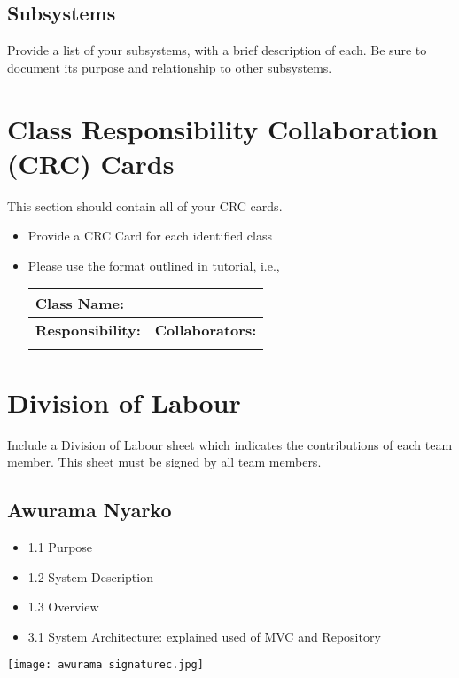 \documentclass[]{article}
\begin{document}
\subsection{Subsystems}
\label{sub:subsystems}
 Provide a list of your subsystems, with a brief description of each. Be sure to document its purpose and relationship to other subsystems.


	
\section{Class Responsibility Collaboration (CRC) Cards}
\label{sec:class_responsibility_collaboration_crc_cards}
This section should contain all of your CRC cards.

\begin{itemize}
	\item Provide a CRC Card for each identified class
	\item Please use the format outlined in tutorial, i.e., 
	\begin{table}[ht]
		\centering
		\begin{tabular}{|p{5cm}|p{5cm}|}
		\hline 
		 \multicolumn{2}{|l|}{\textbf{Class Name:}} \\
		\hline
		\textbf{Responsibility:} & \textbf{Collaborators:} \\
		\hline
		\vspace{1in} & \\
		\hline
		\end{tabular}
	\end{table}
	
\end{itemize}

\appendix
\section{Division of Labour}
\label{sec:division_of_labour}
Include a Division of Labour sheet which indicates the contributions of each team member. This sheet must be signed by all team members.
\subsection{Awurama Nyarko}
\label{subsec:awurama_nyarko}
\begin{itemize}
	\item 1.1 Purpose
	\item 1.2 System Description
	\item 1.3 Overview
	\item 3.1 System Architecture: explained used of MVC and Repository
\end{itemize}
\texttt{[image: awurama signaturec.jpg]}
\end{document}
